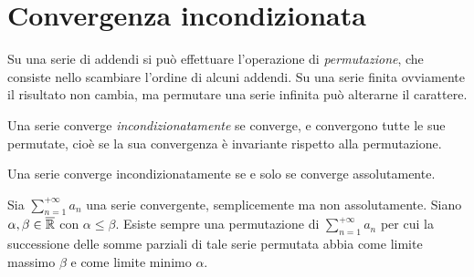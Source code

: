 \section{Convergenza incondizionata}
Su una serie di addendi si può effettuare l'operazione di \emph{permutazione}, che consiste nello scambiare l'ordine di alcuni addendi. Su una serie finita ovviamente il risultato non cambia, ma permutare una serie infinita può alterarne il carattere.
\begin{definizione}
Una serie converge \emph{incondizionatamente} se converge, e convergono tutte le sue permutate, cioè se la sua convergenza è invariante rispetto alla permutazione.
\end{definizione}
\begin{teorema}
Una serie converge incondizionatamente se e solo se converge assolutamente.
\end{teorema}
\begin{teorema}[di Riemann]
Sia $\sum_{n=1}^{+\infty}a_n$ una serie convergente, semplicemente ma non assolutamente. Siano $\alpha,\beta\in\overline{\mathbb{R}}$ con $\alpha\leq\beta$. Esiste sempre una permutazione di $\sum_{n=1}^{+\infty}a_n$ per cui la successione delle somme parziali di tale serie permutata abbia come limite massimo $\beta$ e come limite minimo $\alpha$.
\end{teorema}
